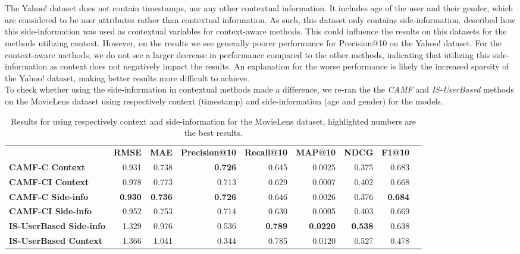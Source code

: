 \\\\
The Yahoo! dataset does not contain timestamps, nor any other contextual information.
It includes age of the user and their gender, which are considered to be user attributes rather than contextual information.
As such, this dataset only contains side-information.
 described how this side-information was used as contextual variables for context-aware methods.
This could influence the results on this datasets for the methods utilizing context.
However, on the results we see generally poorer performance for Precision@10 on the Yahoo! dataset.
For the context-aware methods, we do not see a larger decrease in performance compared to the other methods, indicating that utilizing this side-information as context does not negatively impact the results.
An explanation for the worse performance is likely the increased sparsity of the Yahoo! dataset, making better results more difficult to achieve.\\
To check whether using the side-information in contextual methods made a difference, we re-ran the the \textit{CAMF} and \textit{IS-UserBased} methods on the MovieLens dataset using respectively context (timestamp) and side-information (age and gender) for the models.
\begin{table*}[!htp]\centering
    \caption{Results for using respectively context and side-information for the MovieLens dataset, highlighted numbers are the best results.}\label{tab:movielenscontextsideinfo}
    \scriptsize
    \begin{tabular}{lrrrrrrrr}\toprule
    &\textbf{RMSE} &\textbf{MAE} &\textbf{Precision@10} &\textbf{Recall@10} &\textbf{MAP@10} &\textbf{NDCG} &\textbf{F1@10} \\\cmidrule{2-8}
    \textbf{CAMF-C Context} &0.931 &0.738 &\textbf{0.726} &0.645 &0.0025 &0.375 &0.683 \\\cmidrule{1-8}
    \textbf{CAMF-CI Context} &0.978 &0.773 &0.713 &0.629 &0.0007 &0.402 &0.668 \\\cmidrule{1-8}
    \textbf{CAMF-C Side-info} &\textbf{0.930} &\textbf{0.736} &\textbf{0.726} &0.646 &0.0026 &0.376 &\textbf{0.684} \\\cmidrule{1-8}
    \textbf{CAMF-CI Side-info} &0.952 &0.753 &0.714 &0.630 &0.0005 &0.403 &0.669 \\\cmidrule{1-8}
    \textbf{IS-UserBased Side-info} &1.329 &0.976 &0.536 &\textbf{0.789} &\textbf{0.0220} &\textbf{0.538} &0.638 \\\cmidrule{1-8}
    \textbf{IS-UserBased Context} &1.366 &1.041 &0.344 &0.785 &0.0120 &0.527 &0.478 \\\cmidrule{1-8}
    \bottomrule
    \end{tabular}
\end{table*}
